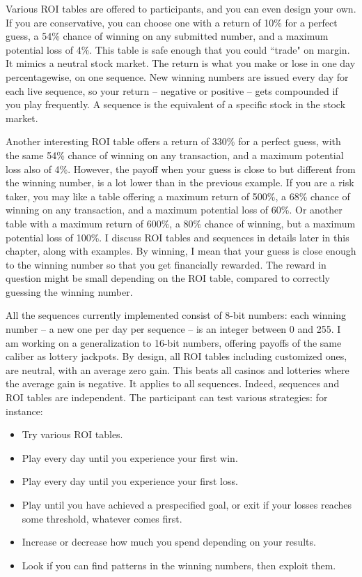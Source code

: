 \documentclass[oneside,10pt]{book}
\begin{document}
Various ROI tables are offered to participants, and you can even design your own. If you are conservative, you can choose one with a return of 10\% for a perfect guess, a 54\% chance of winning on any submitted number, and a maximum potential loss of 4\%. This table is safe enough that you could ``trade" on margin. It mimics
 a neutral stock market. The return is what you make or lose in one day percentagewise, on one sequence. New winning numbers are issued every day for each live sequence, so your return -- negative or positive -- gets compounded if you play frequently.
 A sequence is the equivalent of a specific stock in the stock market.

Another interesting ROI table offers a return of 330\% for a perfect guess, with the same 54\% chance of winning on any transaction, and  a maximum potential loss also of 4\%. However, the payoff when your guess is close to but different from the winning number, is a lot lower than in the previous example.
If you are a risk taker, you may like a table offering a maximum return of 500\%, a 68\% chance of winning on any transaction, and a maximum potential loss of 60\%. Or another table with a maximum return of 600\%, a 80\% chance of winning, but a maximum potential loss of 100\%.  I discuss ROI tables and sequences in details later in this chapter, along with examples. By winning, I mean that your guess is close enough to the winning number so that you get financially rewarded. The reward in question might be small depending on the ROI table, compared to correctly guessing the winning number.

All the sequences currently implemented consist of 8-bit numbers: each winning number -- a new one per day per sequence -- is an integer between 0 and 255. I am working on a generalization to 16-bit numbers, offering payoffs of the same caliber as lottery jackpots. By design, all ROI tables including customized ones, are neutral, with an average zero gain. This beats all casinos and lotteries where the average gain is negative. It applies
 to all sequences. Indeed, sequences and ROI tables are independent. The participant can test various strategies: for instance:
\vspace{1ex}
\begin{itemize}
\item 	Try various ROI tables.
\item 	Play every day until you experience your first win.
\item 	Play every day until you experience your first loss.
\item 	Play until you have achieved a prespecified goal, or exit if your losses reaches some threshold, whatever comes first.
\item 	Increase or decrease how much you spend depending on your results.
\item 	Look if you can find patterns in the winning numbers, then exploit them.
\end{itemize}\vspace{1ex}
\end{document}
